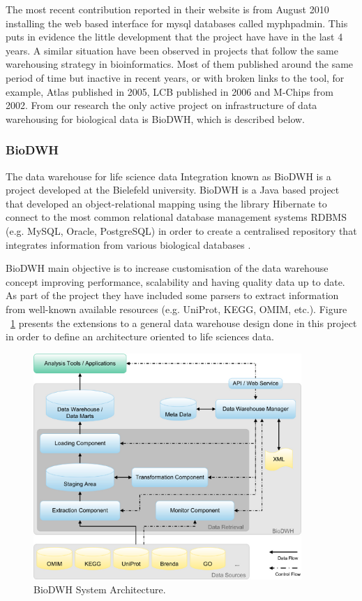 The most recent contribution reported in their website is from August 2010 installing the web based interface for mysql databases called myphpadmin. This puts in evidence the little development that the project have have in the last 4 years. A similar situation have been observed in projects that follow the same warehousing strategy in bioinformatics. Most of them published around the same period of time but inactive in recent years, or with broken links to the tool, for example, Atlas \cite{SHA2005} published in 2005, LCB\cite{AME2006} published in 2006 and M-Chips \cite{FEL2002} from 2002. From our research the only active project on infrastructure of data warehousing for biological data is BioDWH, which is described below.

\subsubsection{BioDWH}
The data warehouse for life science data Integration known as BioDWH is a project developed at  the Bielefeld university. BioDWH is a Java based project that developed an object-relational mapping using the library Hibernate to connect to the most common relational database management systems RDBMS (e.g. MySQL, Oracle, PostgreSQL) in order to create a centralised repository that integrates information from various biological databases \cite{TOP2008}.

BioDWH main objective is to increase customisation of the data warehouse concept improving performance, scalability and having quality data up to date. As part of the project they have included some parsers to extract information from well-known available resources (e.g. UniProt, KEGG, OMIM, etc.). Figure ~\ref{fig:biodwh} presents the extensions to a general data warehouse design done in this project in order to define an architecture oriented to life sciences data.

\begin{figure}  
\includegraphics[width=4in]{figures/dwh_architecture.png}
\caption[BioDWH System Architecture.]{BioDWH System Architecture.
\label{fig:biodwh}}
\end{figure}

